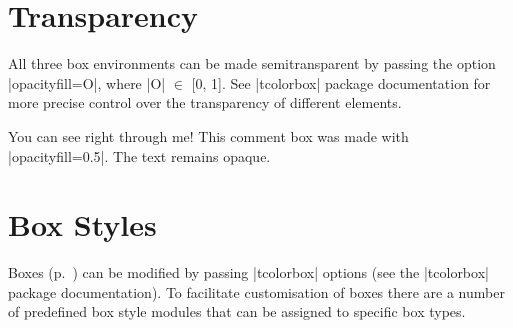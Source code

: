 \documentclass[letterpaper,twocolumn,openany,nodeprecatedcode]{astroinfernobook}
\begin{document}
\section{Transparency}
All three box environments can be made semitransparent by passing the
option |opacityfill=O|, where |O| $\in$ [0, 1]. See |tcolorbox| package documentation
for more precise control over the transparency of different elements.

\begin{AIComment}[opacityfill=0.5]{You can see right through me!}
  This comment box was made with |opacityfill=0.5|.
  The text remains opaque.
\end{AIComment}

\section{Box Styles} \label{sec:boxstyles}
Boxes (p.~\pageref{ch:text_boxes}) can be modified by passing |tcolorbox| options
(see the |tcolorbox| package documentation). To facilitate customisation of boxes
there are a number of predefined box style modules that can be assigned to specific box types.
\end{document}
